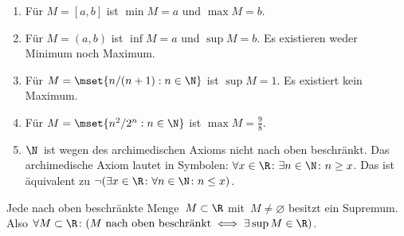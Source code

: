 \documentclass[a4paper]{article}
\begin{document}
\begin{example}\leavevmode
    \begin{enumerate}
        \item Für $M = [a, b]$ ist $\min M = a$ und $\max M = b$.
        \item Für $M = (a, b)$ ist $\inf M = a$ und $\sup M = b$. Es existieren weder Minimum noch Maximum.
        \item Für $M = \mset{n / (n+1) : n \in \N}$ ist $\sup M = 1$. Es existiert kein Maximum.
        \item Für $M = \mset{n^2 / 2^n : n \in \N}$ ist $\max M = \frac{9}{8}$.
        \item $\N$~ist wegen des archimedischen Axioms nicht nach oben beschränkt. Das archimedische Axiom lautet in Symbolen: $\forall x \in \R\colon \exists n \in \N\colon n \geq x$. Das ist äquivalent zu $\neg(\exists x \in \R\colon \forall n \in \N\colon n \leq x)$.
    \end{enumerate}
\end{example}

\begin{theorem}
    Jede nach oben beschränkte Menge~$M \subset \R$ mit~$M \neq \varnothing$ besitzt ein Supremum. Also $\forall M \subset \R\colon (M \text{ nach oben beschränkt} \iff \exists \sup M \in \R)$.
\end{theorem}
\end{document}
